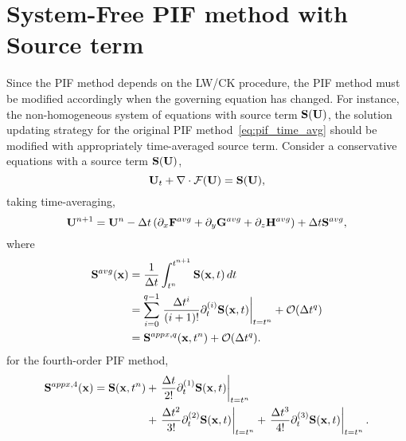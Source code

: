 \section{System-Free PIF method with Source term}\label{sec:sfpif_source}


Since the PIF method depends on the LW/CK procedure,
the PIF method must be modified accordingly when the governing equation has changed.
For instance, the non-homogeneous system of equations with source term \( \mathbf{S}(\mathbf{U}) \),
the solution updating strategy for the original PIF method~\cref{eq:pif_time_avg}
should be modified with appropriately time-averaged source term.
Consider a conservative equations with a source term \( \mathbf{S}(\mathbf{U}) \),
\begin{equation}\label{eq:sf_source_gov}
    \mathbf{U}_{t} + \nabla \cdot \mathcal{F}(\mathbf{U}) = \mathbf{S}(\mathbf{U}),
\end{equation}
taking time-averaging,
\begin{equation}\label{eq:sf_source_time_average}
    \mathbf{U}^{n + 1} = \mathbf{U}^{n} - \Delta t \left( \partial_{x} \mathbf{F}^{avg} + \partial_{y} \mathbf{G}^{avg} + \partial_{z} \mathbf{H}^{avg} \right)
        + \Delta t \mathbf{S}^{avg},
\end{equation}
where
\begin{equation}\label{eq:sf_source_time_taylor}
    \begin{split}
        \mathbf{S}^{avg} (\mathbf{x})
        &= \frac{1}{\Delta t} \int^{t^{n + 1}}_{t^n} \mathbf{S}(\mathbf{x}, t) \mathop{dt}\\
        &= \sum\limits_{i=0}^{q-1}
            \left.\frac{\Delta t^{i}}{(i+1)!} \partial_{t}^{(i)} \mathbf{S} (\mathbf{x}, t) \right|_{t = t^{n}} + \mathcal{O}(\Delta t^{q}) \\
        &= \mathbf{S}^{appx,q} (\mathbf{x}, t^{n}) + \mathcal{O}(\Delta t^{q}).
    \end{split}
\end{equation}
for the fourth-order PIF method,
\begin{equation}\label{eq:sf_source_4order}
    \begin{split}
        \mathbf{S}^{appx, 4} (\mathbf{x}) = \mathbf{S} (\mathbf{x}, t^{n})
            &+ \left. \frac{\Delta t}{2!} \partial_{t}^{(1)} \mathbf{S} (\mathbf{x}, t) \right|_{t = t^{n}}\\
            &+ \left. \frac{\Delta t^{2}}{3!} \partial_{t}^{(2)} \mathbf{S} (\mathbf{x}, t) \right|_{t = t^{n}}
            + \left. \frac{\Delta t^{3}}{4!} \partial_{t}^{(3)} \mathbf{S} (\mathbf{x}, t) \right|_{t = t^{n}}.
    \end{split}
\end{equation}

